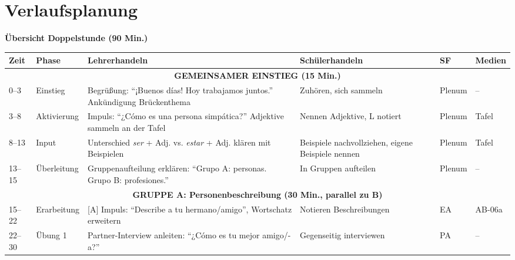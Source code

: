\documentclass[11pt,a4paper]{article}
\begin{document}
\section{Verlaufsplanung}

\textbf{Übersicht Doppelstunde (90 Min.)}

\begin{longtable}{|p{0.8cm}|p{1.5cm}|p{4cm}|p{3cm}|p{1.5cm}|p{2cm}|}
\hline
\textbf{Zeit} & \textbf{Phase} & \textbf{Lehrerhandeln} & \textbf{Schülerhandeln} & \textbf{SF} & \textbf{Medien} \\
\hline
\endhead

\multicolumn{6}{|c|}{\textbf{GEMEINSAMER EINSTIEG (15 Min.)}} \\
\hline

0--3 & Einstieg & Begrüßung: ``¡Buenos días! Hoy trabajamos juntos.'' Ankündigung Brückenthema & Zuhören, sich sammeln & Plenum & -- \\
\hline

3--8 & Aktivierung & Impuls: ``¿Cómo es una persona simpática?'' Adjektive sammeln an der Tafel & Nennen Adjektive, L notiert & Plenum & Tafel \\
\hline

8--13 & Input & Unterschied \textit{ser} + Adj. vs. \textit{estar} + Adj. klären mit Beispielen & Beispiele nachvollziehen, eigene Beispiele nennen & Plenum & Tafel \\
\hline

13--15 & Überleitung & Gruppenaufteilung erklären: ``Grupo A: personas. Grupo B: profesiones.'' & In Gruppen aufteilen & Plenum & -- \\
\hline

\multicolumn{6}{|c|}{\textcolor{gruppeA}{\textbf{GRUPPE A: Personenbeschreibung (30 Min., parallel zu B)}}} \\
\hline

15--22 & Erarbeitung & \textcolor{gruppeA}{[A] Impuls: ``Describe a tu hermano/amigo''}, Wortschatz erweitern & \textcolor{gruppeA}{Notieren Beschreibungen} & EA & AB-06a \\
\hline

22--30 & Übung 1 & \textcolor{gruppeA}{Partner-Interview anleiten: ``¿Cómo es tu mejor amigo/-a?''} & \textcolor{gruppeA}{Gegenseitig interviewen} & PA & -- \\
\hline


\end{longtable}
\end{document}
